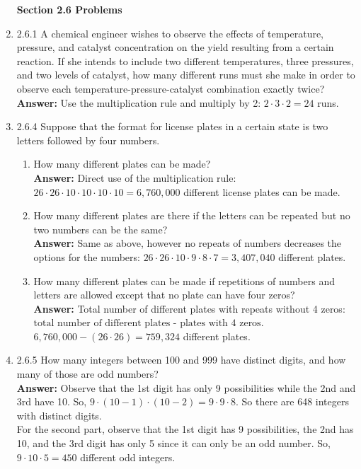 \documentclass{article}
\begin{document}
\begin{enumerate}
        \textbf{Section 2.6 Problems}
        \item 2.6.1 A chemical engineer wishes to observe the effects of temperature, pressure, and catalyst concentration on the yield resulting from a certain reaction. If she intends to include two different temperatures, three pressures, and two levels of catalyst, how many different runs must she make in order to observe each temperature-pressure-catalyst combination exactly twice?\\
        \textbf{Answer: }Use the multiplication rule and multiply by 2: $2 \cdot 3 \cdot 2 = 24$ runs.\\
            
        \item 2.6.4 Suppose that the format for license plates in a certain state is two letters followed by four numbers.
            \begin{enumerate}
                \item How many different plates can be made?\\
                \textbf{Answer: }Direct use of the multiplication rule: $26 \cdot 26 \cdot 10 \cdot 10 \cdot 10 \cdot 10 = 6,760,000$ different license plates can be made.\\
                \item How many different plates are there if the letters can be repeated but no two numbers can be the same?\\
                \textbf{Answer: }Same as above, however no repeats of numbers decreases the options for the numbers: $26 \cdot 26 \cdot 10 \cdot 9 \cdot 8 \cdot 7 = 3,407,040$ different plates.\\
                \item How many different plates can be made if repetitions of numbers and letters are allowed except that no plate can have four zeros?\\
                \textbf{Answer: }Total number of different plates with repeats without 4 zeros: $\text{total number of different plates - plates with 4 zeros}$.  $6,760,000 - (26 \cdot 26) = 759,324$ different plates.\\
            \end{enumerate}
    
        \item 2.6.5 How many integers between 100 and 999 have distinct digits, and how many of those are odd numbers?\\
        \textbf{Answer: }Observe that the 1st digit has only 9 possibilities while the 2nd and 3rd have 10. So, $9 \cdot (10-1) \cdot (10-2) = 9 \cdot 9 \cdot 8$. So there are 648 integers with distinct digits.\\
        For the second part, observe that the 1st digit has 9 possibilities, the 2nd has 10, and the 3rd digit has only 5 since it can only be an odd number. So, $9 \cdot 10 \cdot 5 = 450$ different odd integers.\\
        

\end{enumerate}
\end{document}
